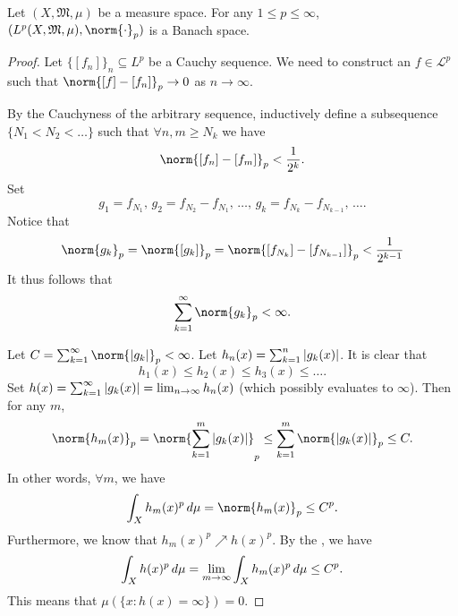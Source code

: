 \documentclass[notoc,notitlepage]{tufte-book}
\begin{document}
\begin{thm}\label{thm:riesz_fischer_theorem}
  Let $(X, \mathfrak{M}, \mu)$ be a measure space. For any $1 \leq p \leq \infty$,
  $(L^p(X, \mathfrak{M}, \mu), \norm{\cdot}_p)$ is a Banach space.
\end{thm}

\begin{proof}
  Let $\{ [f_n] \}_n \subseteq L^p$ be a Cauchy sequence.
  We need to construct an $f \in \mathcal{L}^p$ such that
  $\norm{[f] - [f_n]}_p \to 0$ as $n \to \infty$.

  By the Cauchyness of the arbitrary sequence,
  inductively define a subsequence $\{ N_1 < N_2 < \hdots \}$
  such that $\forall n, m \geq N_k$ we have
  \begin{equation*}
    \norm{[f_n] - [f_m]}_p < \frac{1}{2^k}.
  \end{equation*}
  Set
  \begin{equation*}
    g_1 = f_{N_1},\, g_2 = f_{N_2} - f_{N_1},\,
    \ldots,\, g_k = f_{N_k} - f_{N_{k-1}},\, \ldots.
  \end{equation*}
  Notice that
  \begin{equation*}
    \norm{g_k}_p = \norm{[g_k]}_p = \norm{[f_{N_k}] - [f_{N_{k-1}}]}_p <
    \frac{1}{2^{k-1}}
  \end{equation*}
  It thus follows that
  \begin{equation*}
    \sum_{k=1}^{\infty} \norm{g_k}_p < \infty. 
  \end{equation*}

  Let $C = \sum_{k=1}^{\infty} \norm{\abs{g_k}}_p < \infty$.
  Let $h_n(x) = \sum_{k=1}^{n} \left|g_k(x)\right|$.
  It is clear that
  \begin{equation*}
    h_1(x) \leq h_2(x) \leq h_3(x) \leq \hdots.
  \end{equation*}
  Set $h(x) = \sum_{k=1}^{\infty} \left|g_k(x)\right| = \lim_{n \to \infty} h_n(x)$
  (which possibly evaluates to $\infty$).
  Then for any $m$,
  \begin{equation*}
    \norm{h_m(x)}_p
    = \norm{ \sum_{k=1}^{m} \abs{g_k(x)} }_p
    \leq \sum_{k=1}^{m} \norm{\abs{g_k(x)}}_p \leq C.
  \end{equation*}
  In other words, $\forall m$, we have
  \begin{equation*}
    \int_{X} h_m(x)^p \dif{\mu} = \norm{h_m(x)}_p \leq C^p.
  \end{equation*}
  Furthermore, we know that $h_m(x)^p \nearrow h(x)^p$.
  By the , we have
  \begin{equation*}
    \int_{X} h(x)^p \mathop{}\!d{\mu}
    = \lim_{m \to \infty} \int_{X} h_m(x)^p \mathop{}\!d{\mu} \leq C^p.
  \end{equation*}
  This means that $\mu(\{ x : h(x) = \infty \}) = 0$.


\end{proof}
\end{document}
